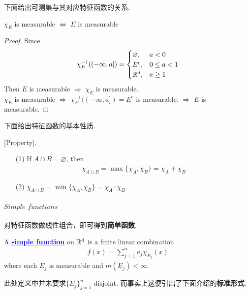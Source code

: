 	\vspace{2em}
	下面给出可测集与其对应特征函数的关系.
	\begin{proposition}\label{prop 2.2.1}
		$\chi_E$ is measurable $\Leftrightarrow$ $E$ is measurable
		
		\vspace{2em}
		\begin{proof}
			Since
			\begin{align}
				\chi_{E}^{-1}((-\infty , a]) = 
				\begin{cases}
					\varnothing , \,\, &a < 0 \\
					E^c , &0 \leq a < 1 \\
					\mathbb{R}^d , &a \geq 1
				\end{cases}
			\end{align}
			Then $E$ is measurable $\Rightarrow$ $\chi_E$ is measurable. \\
			$\chi_E$ is measurable $\Rightarrow$ $\chi_{E}^{-1}((-\infty , a]) = E^c$ is measurable. $\Rightarrow$ $E$ is measurable.
		\end{proof}
	\end{proposition}

	\vspace{2em}
	下面给出特征函数的基本性质.
	\begin{proposition}\label{prop 2.2.2}
		[Property].
		\begin{enumerate}
			\item[(1)]If $A \cap B = \varnothing$, then 
			\begin{align}
				\chi_{A \cup B} = \max{\{ \chi_A , \chi_B \}} = \chi_A + \chi_B
			\end{align}
			
			\item[(2)]$\chi_{A \cap B} = \min{\{ \chi_A , \chi_B \}} = \chi_A \cdot \chi_B$.
		\end{enumerate}
	\end{proposition}

\newpage
\paragraph{$Simple \,\, functions$}
	对特征函数做线性组合，即可得到\textbf{简单函数}.
	\begin{defn}\label{def 2.2.2}
		A \underline{\textcolor{blue}{\textbf{simple function}}} on $\mathbb{R}^d$ is a finite linear combination
		\begin{align}
			f(x) = \sum_{j = 1}^{n}{a_j \chi_{E_j}(x)}
		\end{align}
		where each $E_j$ is measurable and $m(E_j) < \infty$.
		
		\begin{rmk}
			此处定义中并未要求$\{ E_j \}_{j = 1}^{n}$ disjoint. 而事实上这便引出了下面介绍的\textbf{标准形式}.
		\end{rmk}
	\end{defn}

